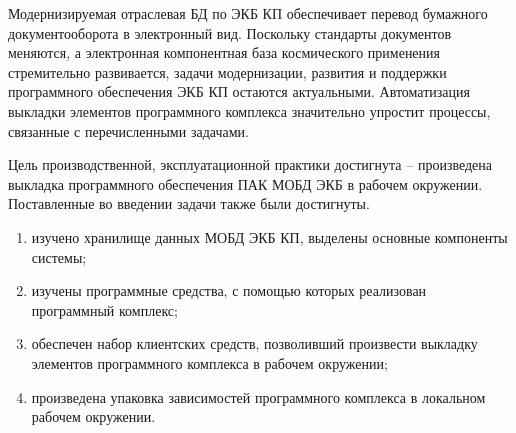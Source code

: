 
Модернизируемая отраслевая БД по ЭКБ КП обеспечивает перевод бумажного документооборота в электронный вид. Поскольку стандарты документов меняются, а электронная компонентная база космического применения стремительно развивается, задачи модернизации, развития и поддержки программного обеспечения ЭКБ КП остаются актуальными. Автоматизация выкладки элементов программного комплекса значительно упростит процессы, связанные с перечисленными задачами.

Цель производственной, эксплуатационной практики достигнута -- произведена выкладка программного обеспечения ПАК МОБД ЭКБ в рабочем окружении. Поставленные во введении задачи также были достигнуты.
\begin{enumerate}
	\item изучено хранилище данных МОБД ЭКБ КП, выделены основные компоненты системы;
	\item изучены программные средства, с помощью которых реализован программный комплекс;
	\item обеспечен набор клиентских средств, позволивший произвести выкладку элементов программного комплекса в рабочем окружении;
	\item произведена упаковка зависимостей программного комплекса в локальном рабочем окружении.
\end{enumerate}